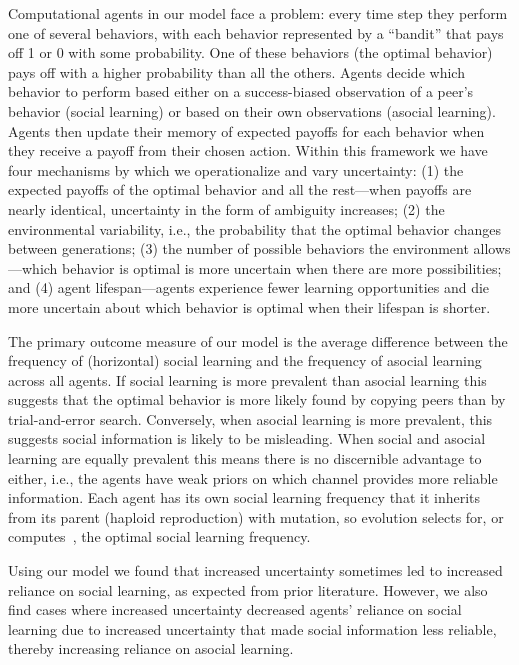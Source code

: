 \documentclass[letterpaper,11.5pt]{scrartcl}
\begin{document}
Computational agents in our model face a problem: every time step they perform
one of several behaviors, with each behavior represented by a ``bandit'' that
pays off 1 or 0 with some probability. One of these behaviors (the optimal
behavior) pays off with a higher probability than all the others.
Agents decide which behavior to 
perform based either on a success-biased observation 
of a peer's behavior (social learning) or based on their own observations (asocial learning).
Agents then update their memory of expected payoffs for each behavior 
when they receive a payoff from their chosen
action. Within this framework we have four mechanisms by which we operationalize 
and vary uncertainty:
(1) the expected payoffs of the optimal behavior and all the rest---when payoffs
are nearly identical, uncertainty in the form of ambiguity increases; (2) the
environmental variability, i.e., the probability that the optimal behavior 
changes between generations; (3) the number of possible behaviors the environment allows---which
behavior is optimal is more uncertain when there are more possibilities; and (4)
 agent lifespan---agents experience fewer learning opportunities and die more uncertain about which behavior
is optimal when their lifespan is shorter. 

The primary outcome measure of our
model is the average difference between the frequency of (horizontal) 
social learning and the frequency of asocial
learning across all agents. If social learning is more prevalent than asocial
learning this suggests that the optimal behavior is more likely found
by copying peers than by trial-and-error search.
Conversely, when asocial learning is more prevalent, this suggests social information
is likely to be misleading. 
When social and asocial learning are 
equally prevalent this means there is no discernible advantage to either, i.e.,
the agents have weak priors on which channel provides more reliable information. 
Each agent has its own social learning frequency that it inherits from its
parent (haploid reproduction) with mutation, so evolution selects for,
or computes~\cite{Smaldino2013}, the optimal
social learning frequency.

Using our model we found that increased uncertainty sometimes
led to increased reliance on social learning, as expected from prior literature. However, we also find cases where increased uncertainty decreased agents' reliance on social learning
due to increased uncertainty that made social information less reliable, thereby
increasing reliance on asocial learning.
\end{document}
